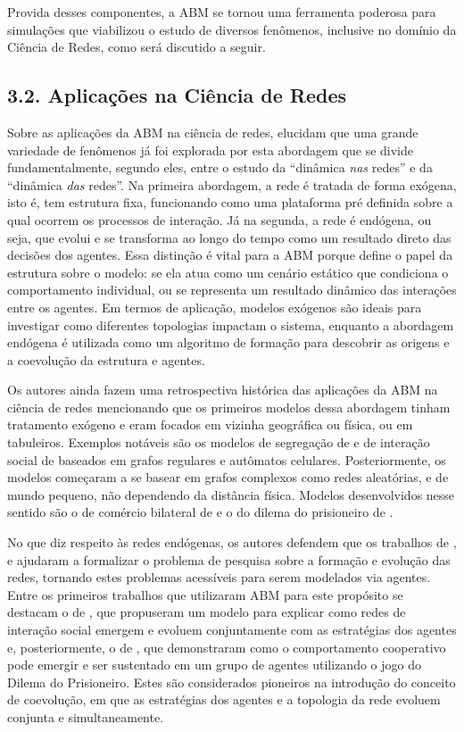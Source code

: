 \documentclass[12pt,oneside,a4paper,brazil,sumario=tradicional]{abntex2}
\begin{document}
Provida desses componentes, a ABM se tornou uma ferramenta poderosa para simulações que viabilizou o estudo de diversos fenômenos, inclusive no domínio da Ciência de Redes, como será discutido a seguir.

\subsection*{3.2. Aplicações na Ciência de Redes}
Sobre as aplicações da ABM na ciência de redes, \textcite{namatame2016} elucidam que uma grande variedade de fenômenos já foi explorada por esta abordagem que se divide fundamentalmente, segundo eles, entre o estudo da “dinâmica \textit{nas }redes” e da “dinâmica \textit{das} redes”. Na primeira abordagem, a rede é tratada de forma exógena, isto é, tem estrutura fixa, funcionando como uma plataforma pré definida sobre a qual ocorrem os processos de interação. Já na segunda, a rede é endógena, ou seja, que evolui e se transforma ao longo do tempo como um resultado direto das decisões dos agentes. Essa distinção é vital para a ABM porque define o papel da estrutura sobre o modelo: se ela atua como um cenário estático que condiciona o comportamento individual, ou se representa um resultado dinâmico das interações entre os agentes. Em termos de aplicação, modelos exógenos são ideais para investigar como diferentes topologias impactam o sistema, enquanto a abordagem endógena é utilizada como um algoritmo de formação para descobrir as origens e a coevolução da estrutura e agentes.

Os autores ainda fazem uma retrospectiva histórica das aplicações da ABM na ciência de redes mencionando que os primeiros modelos dessa abordagem tinham tratamento exógeno e eram focados em vizinha geográfica ou física, ou em tabuleiros. Exemplos notáveis são os modelos de segregação de \textcite{schelling1971} e de interação social de \textcite{sakoda1971} baseados em grafos regulares e autômatos celulares. Posteriormente, os modelos começaram a se basear em grafos complexos como redes aleatórias, e de mundo pequeno, não dependendo da distância física. Modelos desenvolvidos nesse sentido são o de comércio bilateral de \textcite{wilhite2001} e o do dilema do prisioneiro de \textcite{abramson2001}.

No que diz respeito às redes endógenas, os autores defendem que os trabalhos de \textcite{watts1998}, e \textcite{barabasi1999} ajudaram a formalizar o problema de pesquisa sobre a formação e evolução das redes, tornando estes problemas acessíveis para serem modelados via agentes. Entre os primeiros trabalhos que utilizaram ABM para este propósito se destacam o de \textcite{skyrms2000}, que propuseram um modelo para explicar como redes de interação social emergem e evoluem conjuntamente com as estratégias dos agentes e, posteriormente, o de \textcite{zimmermann2005}, que demonstraram como o comportamento cooperativo pode emergir e ser sustentado em um grupo de agentes utilizando o jogo do Dilema do Prisioneiro. Estes são considerados pioneiros na introdução do conceito de coevolução, em que as estratégias dos agentes e a topologia da rede evoluem conjunta e simultaneamente.
\end{document}

